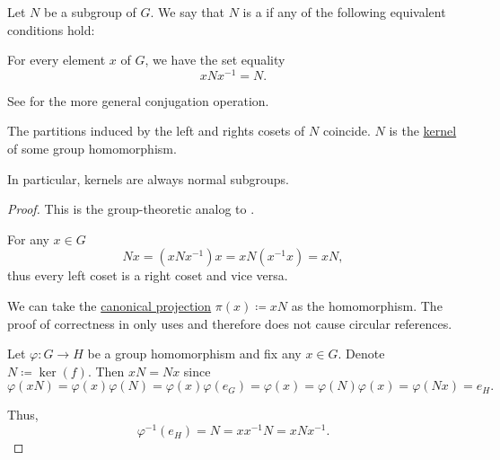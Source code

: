 \begin{definition}\label{def:normal_subgroup}
  Let \( N \) be a subgroup of \( G \). We say that \( N \) is a  if any of the following equivalent conditions hold:
  \begin{thmenum}
     For every element \( x \) of \( G \), we have the set equality
    \begin{equation}\label{eq:def:normal_subgroup/direct}
      x N x^{-1} = N.
    \end{equation}

    See  for the more general conjugation operation.

     The partitions induced by the left and rights cosets of \( N \) coincide.
     \( N \) is the \hyperref[thm:group_kernels]{kernel} of some group homomorphism.
  \end{thmenum}

  In particular, kernels are always normal subgroups.
\end{definition}
\begin{proof}
  This is the group-theoretic analog to .

   For any \( x \in G \)
  \begin{equation*}
    N x = (x N x^{-1})x = x N(x^{-1}x) = x N,
  \end{equation*}
  thus every left coset is a right coset and vice versa.

   We can take the \hyperref[def:quotient_group]{canonical projection} \( \pi(x) \coloneqq x N \) as the homomorphism. The proof of correctness in  only uses  and therefore does not cause circular references.

   Let \( \varphi: G \to H \) be a group homomorphism and fix any \( x \in G \). Denote \( N \coloneqq \ker(f) \). Then \( x N = N x \) since
  \begin{equation*}
    \varphi(x N)
    =
    \varphi(x) \varphi(N)
    =
    \varphi(x) \varphi(e_G)
    =
    \varphi(x)
    =
    \varphi(N) \varphi(x)
    =
    \varphi(N x)
    =
    e_H.
  \end{equation*}

  Thus,
  \begin{equation*}
    \varphi^{-1}(e_H) = N = xx^{-1}N = x N x^{-1}.
  \end{equation*}
\end{proof}

